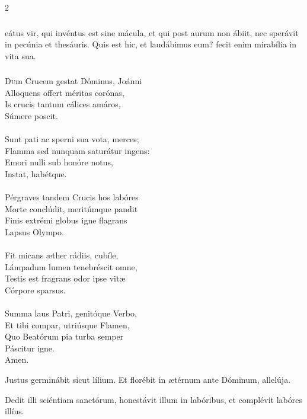 \documentclass[9pt,twoside]{extarticle}
\begin{document}
\begin{multicols}{2}
\subsubsection*{\center {}}
eátus vir, qui invéntus est sine mácula, et qui post aurum non ábiit, nec sperávit in pecúnia et thesáuris. Quis est hic, et laudábimus eum? fecit enim mirabília in vita sua.

\subsubsection*{\center{}}
\lettrine{D}um Crucem gestat Dóminus, Joánni\\ Alloquens offert méritas corónas,\\ Is crucis tantum cálices amáros,\\ Súmere poscit.\\
\\
Sunt pati ac sperni sua vota, merces;\\ Flamma sed nunquam saturátur ingens:\\ Emori nulli sub honóre notus,\\ Instat, habétque.\\
\\
Pérgraves tandem Crucis hos labóres\\ Morte conclúdit, meritúmque pandit\\ Finis extrémi globus igne flagrans\\ Lapsus Olympo.\\
\\
Fit micans æther rádiis, cubíle,\\ Lámpadum lumen tenebréscit omne,\\ Testis est fragrans odor ipse vitæ\\ Córpore sparsus.\\
\\
Summa laus Patri, genitóque Verbo,\\ Et tibi compar, utriúsque Flamen,\\ Quo Beatórum pia turba semper\\ Páscitur igne.\\
Amen.

\begin{tightlist}{}
\item {} Justus germinábit sicut lílium.  Et florébit in ætérnum ante Dóminum, allelúja.
\item {} Dedit illi sciéntiam sanctórum, honestávit illum in labóribus, et complévit labóres illíus.
\end{tightlist}


\end{multicols}
\end{document}
